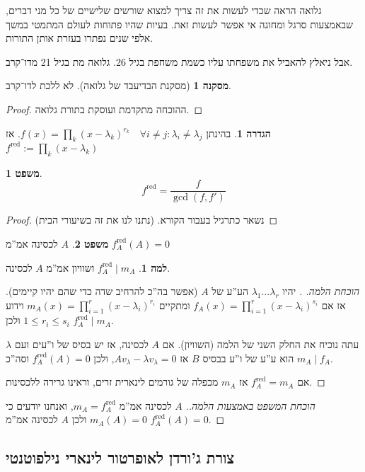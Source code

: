 \documentclass[a4paper]{article}
\newcommand\co        {\colon}
\renewcommand\lg      {\lambda}
\theoremstyle{definition}
\newtheorem{Theorem}{\color{myblue}משפט}
\newtheorem{Definition}{\color{mygreen}הגדרה}
\newtheorem{Lemma}{\color{myyellow}למה}
\newtheorem{Collary}{\color{mymagenta}מסקנה}
\newcommand\theo  [1] {\begin{Theorem}#1\end{Theorem}}
\newcommand\defi  [1] {\begin{Definition}#1\end{Definition}}
\newcommand\lem   [1] {\begin{Lemma}#1\end{Lemma}}
\begin{document}
	גלואה הראה שכדי לעשות את זה צריך למצוא שורשים שלישיים של כל מני דברים, שבאמצעות סרגל ומחוגה אי אפשר לעשות זאת. בעיות שהיו פתוחות לעולם המתמטי במשך אלפי שנים נפתרו בעזרת אותן התורות. 
	
	אבל ניאלץ להאביל את משפחתו עליו  כשמת משחפת בגיל 26. גלואה מת בגיל 21 מדו־קרב. 
	\begin{Collary}[מסקנת הבדיעבד של גלואה]
		לא ללכת לדו־קרב. 
	\end{Collary}
	\begin{proof}
		ההוכחה מתקדמת ועוסקת בתורת גלואה. 
	\end{proof}
	
	\defi{בהינתן $f(x) = \prod_{k}(x - \lg_k)^{r_k} \quad \forall i \neq j \co \lg_i \neq \lg_j$. אז $f^{\mathrm{red}} := \prod_{k}(x - \lg_k)$}
	
	\theo{
	\[ f^{\mathrm{red}} = \frac{f}{\gcd(f, f')} \]}
	\begin{proof}
		נשאר כתרגיל בעבור הקורא. (נתנו לנו את זה בשיעורי הבית)
	\end{proof}
	
	\theo{$A$ לכסינה אמ''מ $f_A^{\mathrm{red}}(A) = 0$}
	
	\lem{$f_A^{\mathrm{red}} \mid m_A$ ושוויון אמ''מ $A$ לכסינה. }
	
	\begin{proof}[הוכחת הלמה. ]
		יהיו $\lg_1 \dots \lg_r$ הע''ע של $A$ (אפשר בה''כ להרחיב שדה כדי שהם יהיו קיימים). אז אם $f_A(x) = \prod_{i = 1}^{r}(x - \lg_i)^{s_i}$ ומתקיים $m_A(x) = \prod_{i = 1}^{r}(x - \lg_i)^{r_i}$ וידוע $1 \le r_i \le s_i$ ולכן $f_A^{\mathrm{red}} \mid m_A$. 
		
		עתה נוכיח את החלק השני של הלמה (השוויון). אם $A$ לכסינה, אז יש בסיס של ו''עים ועם $\lg$ הוא ע''ע של ו''ע בבסיס $B$ אז $Av_\lg - \lg v_\lg = 0$, ולכן $f_A^{\mathrm{red}}(A) = 0$ וסה''כ $m_A \mid f_A$. 
		
		אם $f_A^{\mathrm{red}} = m_A$ אז $m_A$ מכפלה של גורמים לינארית זרים, וראינו גרירה ללכסינות. 
	\end{proof}
	
	\begin{proof}[הוכחת המשפט באמצעות הלמה.]
		$A$ לכסינה אמ''מ $m_A = f_A^{\mathrm{red}}$, ואנחנו יודעים כי $m_A(A) = 0$ ולכן $A$ לכסינה אמ''מ $f_A^{\mathrm{red}}(A) = 0$. 
	\end{proof}
	
	\subsection{צורת ג'ורדן לאופרטור לינארי נילפוטנטי}
\end{document}
